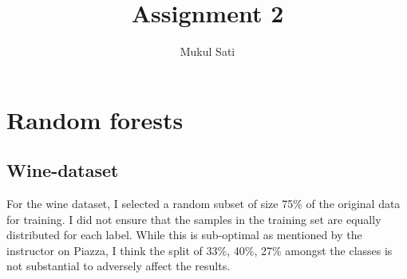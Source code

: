 \documentclass[5pt]{article}
\title{Assignment 2}
\author{Mukul Sati}
\begin{document}
\section{Random forests}
\subsection{Wine-dataset}
For the wine dataset, I selected a random subset of size 75\% of the original data
for training. I did not ensure that the samples in the training set are equally
distributed for each label. While this is sub-optimal as mentioned by the
instructor on Piazza, I think the split of {33\%, 40\%, 27\%} amongst the classes
is not substantial to adversely affect the results.
\end{document}
